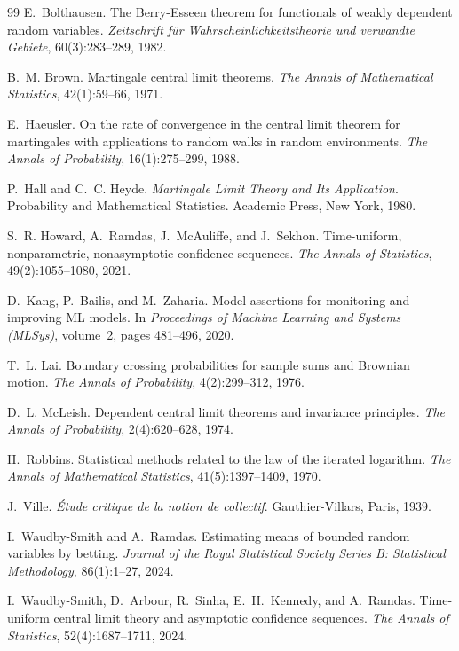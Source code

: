 \documentclass[11pt,a4paper]{article}
\begin{document}
\begin{thebibliography}{99}
E.~Bolthausen.
\newblock The Berry-Esseen theorem for functionals of weakly dependent random variables.
\newblock \emph{Zeitschrift f{\"u}r Wahrscheinlichkeitstheorie und verwandte Gebiete}, 60(3):283--289, 1982.

B.~M. Brown.
\newblock Martingale central limit theorems.
\newblock \emph{The Annals of Mathematical Statistics}, 42(1):59--66, 1971.

E.~Haeusler.
\newblock On the rate of convergence in the central limit theorem for martingales with applications to random walks in random environments.
\newblock \emph{The Annals of Probability}, 16(1):275--299, 1988.

P.~Hall and C.~C. Heyde.
\newblock \emph{Martingale Limit Theory and Its Application}.
\newblock Probability and Mathematical Statistics. Academic Press, New York, 1980.

S.~R. Howard, A.~Ramdas, J.~McAuliffe, and J.~Sekhon.
\newblock Time-uniform, nonparametric, nonasymptotic confidence sequences.
\newblock \emph{The Annals of Statistics}, 49(2):1055--1080, 2021.

D.~Kang, P.~Bailis, and M.~Zaharia.
\newblock Model assertions for monitoring and improving ML models.
\newblock In \emph{Proceedings of Machine Learning and Systems (MLSys)}, volume~2, pages 481--496, 2020.

T.~L. Lai.
\newblock Boundary crossing probabilities for sample sums and Brownian motion.
\newblock \emph{The Annals of Probability}, 4(2):299--312, 1976.

D.~L. McLeish.
\newblock Dependent central limit theorems and invariance principles.
\newblock \emph{The Annals of Probability}, 2(4):620--628, 1974.

H.~Robbins.
\newblock Statistical methods related to the law of the iterated logarithm.
\newblock \emph{The Annals of Mathematical Statistics}, 41(5):1397--1409, 1970.

J.~Ville.
\newblock \emph{{\'E}tude critique de la notion de collectif}.
\newblock Gauthier-Villars, Paris, 1939.

I.~Waudby-Smith and A.~Ramdas.
\newblock Estimating means of bounded random variables by betting.
\newblock \emph{Journal of the Royal Statistical Society Series B: Statistical Methodology}, 86(1):1--27, 2024.

I.~Waudby-Smith, D.~Arbour, R.~Sinha, E.~H.~Kennedy, and A.~Ramdas.
\newblock Time-uniform central limit theory and asymptotic confidence sequences.
\newblock \emph{The Annals of Statistics}, 52(4):1687--1711, 2024.
\end{thebibliography}
\end{document}
